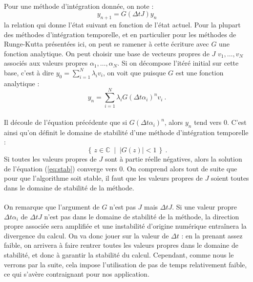       \paragraph{}
      Pour une méthode d'intégration donnée, on note :
      \begin{equation}\label{eq:stab_req}
        y_{n+1} = G\left(\Delta tJ\right)y_n
      \end{equation}
      la relation qui donne l'état suivant en fonction de l'état actuel.
      Pour la plupart des méthodes d'intégration temporelle, et en particulier pour les méthodes de Runge-Kutta présentées ici, on peut se ramener à cette écriture avec $G$ une fonction analytique.
      On peut choisir une base de vecteurs propres de $J$ $v_1, \dots, v_N$ associés aux valeurs propres $\alpha_1, \dots, \alpha_N$.
      Si on décompose l'itéré initial sur cette base, c'est à dire $y_0 = \sum_{i=1}^N\lambda_iv_i$, on voit que puisque $G$ est une fonction analytique :
      \[y_n = \sum_{i=1}^N\lambda_iG\left(\Delta t\alpha_i\right)^nv_i\ .\]

      \paragraph{}
      Il découle de l'équation précédente que si $G\left(\Delta t\alpha_i\right)^n$, alors $y_n$ tend vers 0.
      C'est ainsi qu'on définit le domaine de stabilité d'une méthode d'intégration temporelle :
      \[\left\{\,z\in\mathbb{C}\;\mid\;\left|G\left(z\right)\right| < 1\,\right\}\ .\]
      Si toutes les valeurs propres de $J$ sont à partie réelle négatives, alors la solution de l'équation (\ref{eq:stab}) converge vers 0.
      On comprend alors tout de suite que pour que l'algorithme soit stable, il faut que les valeurs propres de $J$ soient toutes dans le domaine de stabilité de la méthode.

      \paragraph{}
      On remarque que l'argument de $G$ n'est pas $J$ mais $\Delta tJ$.
      Si une valeur propre $\Delta t\alpha_i$ de $\Delta tJ$ n'est pas dans le domaine de stabilité de la méthode, la direction propre associée sera amplifiée et une instabilité d'origine numérique entraînera la divergence du calcul.
      On va donc jouer sur la valeur de $\Delta t$ : en la prenant assez faible, on arrivera à faire rentrer toutes les valeurs propres dans le domaine de stabilité, et donc à garantir la stabilité du calcul.
      Cependant, comme nous le verrons par la suite, cela impose l'utilisation de pas de temps relativement faible, ce qui s'avère contraignant pour nos application.


